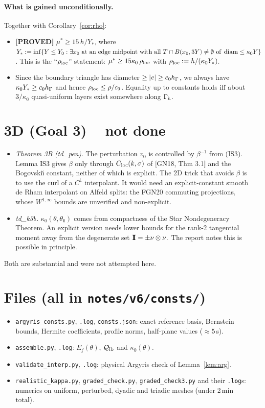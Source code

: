 \documentclass[11pt]{article}
\theoremstyle{remark}\newtheorem{remark}[theorem]{Remark}
\newcommand{\lab}[1]{\textbf{[#1]}}
\begin{document}
\paragraph{What is gained unconditionally.} Together with Corollary~\ref{cor:rho}:
\begin{itemize}
\item \lab{PROVED} $\mu^\ast\ge15\,h/Y_\ast$, where $Y_\ast:=\inf\{Y\le Y_0:\exists x_0\text{ at an edge midpoint with all }T\cap B(x_0,3Y)\neq\emptyset\text{ of }\operatorname{diam}\le\kappa_0Y\}$.
This is the ``$\rho_{\rm loc}$'' statement: $\mu^\ast\ge15\kappa_0\,\rho_{\rm loc}$ with $\rho_{\rm loc}:=h/(\kappa_0Y_\ast)$.
\item Since the boundary triangle has diameter $\ge|e|\ge c_0h_\Gamma$, we always have $\kappa_0Y_\ast\ge c_0h_\Gamma$ and hence
$\rho_{\rm loc}\le\rho/c_0$. Equality up to constants holds iff about $3/\kappa_0$ quasi-uniform layers exist somewhere
along $\Gamma_h$.
\end{itemize}

\section{3D (Goal 3) -- not done}\label{sec:3d}
\begin{itemize}
\item \emph{Theorem 3B (td\_pen).} The perturbation $v_0$ is controlled by $\beta^{-1}$ from (IS3). Lemma IS3 gives $\beta$
only through $C_{\rm loc}(k,\sigma)$ of [GN18, Thm 3.1] and the Bogovski\u{\i} constant, neither of which is explicit. The 2D
trick that avoids $\beta$ is to use the curl of a $C^1$ interpolant. It would need an explicit-constant smooth de Rham
interpolant on Alfeld splits: the FGN20 commuting projections, whose $W^{1,\infty}$ bounds are unverified and non-explicit.
\item \emph{td\_k3b.} $\kappa_0(\theta,\theta_0)$ comes from compactness of the Star Nondegeneracy Theorem. An explicit
version needs lower bounds for the rank-2 tangential moment away from the degenerate set $\mathrm{I\!I}=\pm\nu\otimes\nu$. The report
notes this is possible in principle.
\end{itemize}
Both are substantial and were not attempted here.

\section*{Files (all in \texttt{notes/v6/consts/})}
\begin{itemize}
\item \texttt{argyris\_consts.py}, \texttt{.log}, \texttt{consts.json}: exact reference basis, Bernstein bounds, Hermite
coefficients, profile norms, half-plane values ($\approx5$\,s).
\item \texttt{assemble.py}, \texttt{.log}: $E_j(\theta)$, $\mathcal Q_{\rm lb}$ and $\kappa_0(\theta)$.
\item \texttt{validate\_interp.py}, \texttt{.log}: physical Argyris check of Lemma~\ref{lem:arg}.
\item \texttt{realistic\_kappa.py}, \texttt{graded\_check.py}, \texttt{graded\_check3.py} and their \texttt{.log}s:
numerics on uniform, perturbed, dyadic and triadic meshes (under 2\,min total).
\end{itemize}
\end{document}
